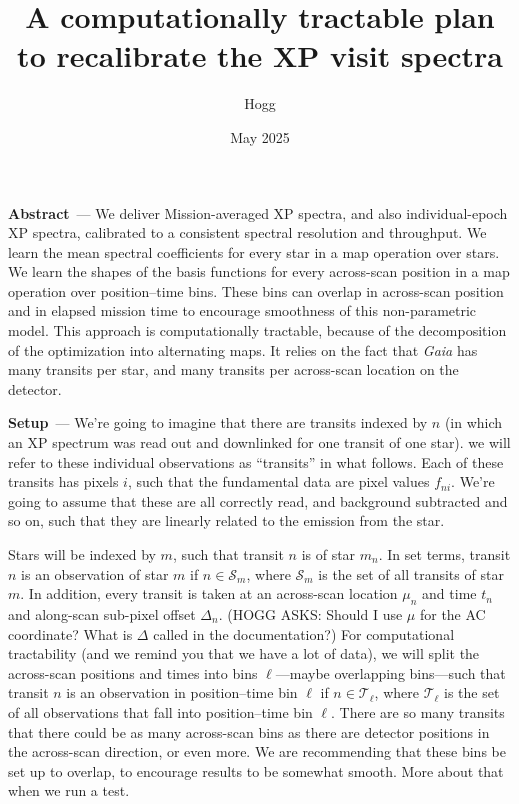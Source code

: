 \documentclass{article}
\title{\bfseries A computationally tractable plan to recalibrate the XP visit spectra}
\author{Hogg}
\date{May 2025}
\renewcommand{\paragraph}[1]{\bigskip\par\noindent\textbf{#1}~---}
\newcommand{\set}[1]{\mathscr{#1}}
\begin{document}
\maketitle

\paragraph{Abstract}
We deliver Mission-averaged XP spectra, and also individual-epoch XP spectra, calibrated to a consistent spectral resolution and throughput.
We learn the mean spectral coefficients for every star in a map operation over stars.
We learn the shapes of the basis functions for every across-scan position in a map operation over position--time bins.
These bins can overlap in across-scan position and in elapsed mission time to encourage smoothness of this non-parametric model.
This approach is computationally tractable, because of the decomposition of the optimization into alternating maps.
It relies on the fact that \textsl{Gaia} has many transits per star, and many transits per across-scan location on the detector.

\paragraph{Setup}
We're going to imagine that there are transits indexed by $n$ (in which an XP spectrum was read out and downlinked for one transit of one star).
we will refer to these individual observations as ``transits'' in what follows.
Each of these transits has pixels $i$, such that the fundamental data are pixel values $f_{ni}$.
We're going to assume that these are all correctly read, and background subtracted and so on, such that they are linearly related to the emission from the star.

Stars will be indexed by $m$, such that transit $n$ is of star $m_n$.
In set terms, transit $n$ is an observation of star $m$ if $n\in\set{S}_m$, where $\set{S}_m$ is the set of all transits of star $m$.
In addition, every transit is taken at an across-scan location $\mu_n$ and time $t_n$ and along-scan sub-pixel offset $\Delta_n$.
(HOGG ASKS: Should I use $\mu$ for the AC coordinate? What is $\Delta$ called in the documentation?)
For computational tractability (and we remind you that we have a lot of data), we will split the across-scan positions and times into bins $\ell$---maybe overlapping bins---such that transit $n$ is an observation in position--time bin $\ell$ if $n\in\set{T}_\ell$, where $\set{T}_\ell$ is the set of all observations that fall into position--time bin $\ell$.
There are so many transits that there could be as many across-scan bins as there are detector positions in the across-scan direction, or even more.
We are recommending that these bins be set up to overlap, to encourage results to be somewhat smooth.
More about that when we run a test.
\end{document}
